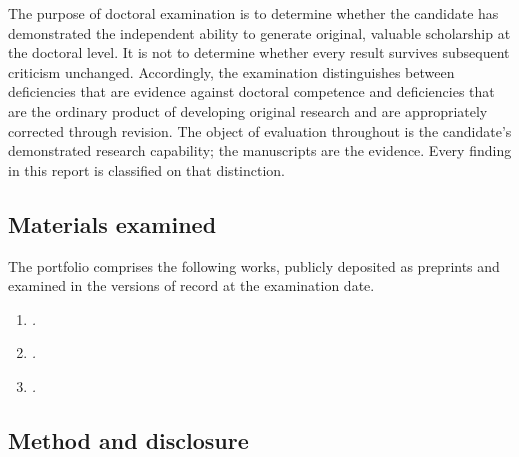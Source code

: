 \documentclass[11pt]{article}
\newcommand{\examinerRole}{Doctoral Examiner}
\newif\ifdraftnotes     \draftnotesfalse     %
\newcommand{\note}[1]{\ifdraftnotes\textcolor{red}{\small[\,#1\,]}\fi}
\begin{document}
The purpose of doctoral examination is to determine whether the candidate has
demonstrated the independent ability to generate original, valuable scholarship
at the doctoral level. It is not to determine whether every result survives
subsequent criticism unchanged. Accordingly, the examination distinguishes
between deficiencies that are evidence against doctoral competence and
deficiencies that are the ordinary product of developing original research and
are appropriately corrected through revision. The object of evaluation
throughout is the candidate's demonstrated research capability; the manuscripts
are the evidence. Every finding in this report is classified on that
distinction.

\subsection{Materials examined}\label{sec:materials}

The portfolio comprises the following works, publicly deposited as preprints and
examined in the versions of record at the examination date.

\begin{enumerate}[label=\textbf{Paper \arabic*.},leftmargin=5.5em,itemsep=0.35em]
\item \emph{\note{Title of Paper 1}.} \note{Repository, DOI; earlier versions.}
\item \emph{\note{Title of Paper 2}.} \note{Repository, DOI.}
\item \emph{\note{Title of Paper 3}.} \note{Repository, DOI.}
\end{enumerate}

\subsection{Method and disclosure}\label{sec:method}

\note{How the technical examinations were prepared: line-by-line audit,
independent verification of every computationally checkable claim, and the
arithmetic regime used. Define ``the examiner'' and ``the \examinerRole'' as
they are used in the per-paper sections. State the standard to which the
candidate's responses were prepared and verified. State whether findings are
reproduced verbatim or in edited form, and that the manuscripts and exhibits
are incorporated by reference. If any part of the technical examination was
prepared with the assistance of software tools, including AI systems, state
which parts and how their output was checked.}
\end{document}
